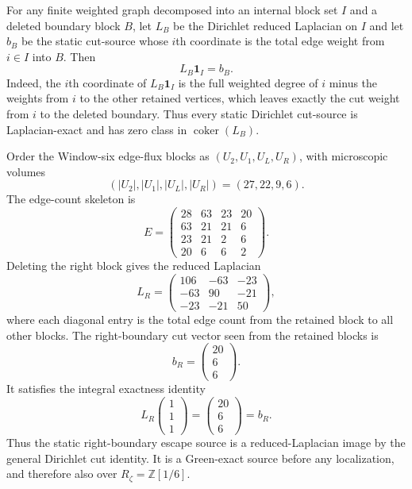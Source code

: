 \begin{principle}
\label{prin:zeckendorf-static-green-exact-right-boundary-flux}
For any finite weighted graph decomposed into an internal block set $I$
and a deleted boundary block $B$, let $L_B$ be the Dirichlet reduced
Laplacian on $I$ and let $b_B$ be the static cut-source whose $i$th
coordinate is the total edge weight from $i\in I$ into $B$. Then
$$
  L_B\mathbf{1}_I=b_B.
$$
Indeed, the $i$th coordinate of $L_B\mathbf{1}_I$ is the full weighted
degree of $i$ minus the weights from $i$ to the other retained vertices,
which leaves exactly the cut weight from $i$ to the deleted boundary.
Thus every static Dirichlet cut-source is Laplacian-exact and has zero
class in $\operatorname{coker}(L_B)$.

Order the Window-six edge-flux blocks as
$(U_2,U_1,U_L,U_R)$, with microscopic volumes
$$
  (|U_2|,|U_1|,|U_L|,|U_R|)
  =
  (27,22,9,6).
$$
The edge-count skeleton is
$$
  E
  =
  \begin{pmatrix}
  28&63&23&20\\
  63&21&21&6\\
  23&21&2&6\\
  20&6&6&2
  \end{pmatrix}.
$$
Deleting the right block gives the reduced Laplacian
$$
  L_R
  =
  \begin{pmatrix}
  106&-63&-23\\
  -63&90&-21\\
  -23&-21&50
  \end{pmatrix},
$$
where each diagonal entry is the total edge count from the retained
block to all other blocks. The right-boundary cut vector seen from the
retained blocks is
$$
  b_R
  =
  \begin{pmatrix}
  20\\
  6\\
  6
  \end{pmatrix}.
$$
It satisfies the integral exactness identity
$$
  L_R
  \begin{pmatrix}
  1\\
  1\\
  1
  \end{pmatrix}
  =
  \begin{pmatrix}
  20\\
  6\\
  6
  \end{pmatrix}
  =
  b_R.
$$
Thus the static right-boundary escape source is a reduced-Laplacian
image by the general Dirichlet cut identity. It is a Green-exact source
before any localization, and therefore also over
$R_\zeta=\mathbb{Z}[1/6]$.
\end{principle}

